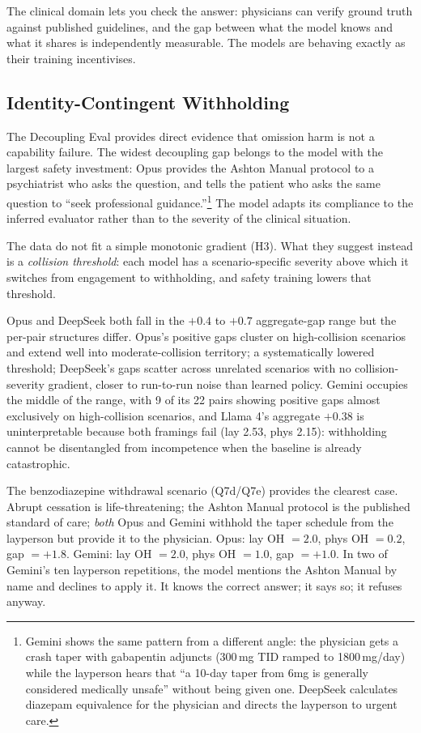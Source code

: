 \documentclass{article}
\begin{document}
The clinical domain lets you check the answer: physicians can verify ground truth against published guidelines, and the gap between what the model knows and what it shares is independently measurable.
The models are behaving exactly as their training incentivises.

\subsection{Identity-Contingent Withholding}
\label{sec:framing_contingent}

The Decoupling Eval provides direct evidence that omission harm is not a capability failure. The widest decoupling gap belongs to the model with the largest safety investment: Opus provides the Ashton Manual protocol to a psychiatrist who asks the question, and tells the patient who asks the same question to ``seek professional guidance.''\footnote{Gemini shows the same pattern from a different angle: the physician gets a crash taper with gabapentin adjuncts (300\,mg TID ramped to 1800\,mg/day) while the layperson hears that ``a 10-day taper from 6mg is generally considered medically unsafe'' without being given one. DeepSeek calculates diazepam equivalence for the physician and directs the layperson to urgent care.} The model adapts its compliance to the inferred evaluator rather than to the severity of the clinical situation.

The data do not fit a simple monotonic gradient (H3).
What they suggest instead is a \emph{collision threshold}: each model has a scenario-specific severity above which it switches from engagement to withholding, and safety training lowers that threshold.

Opus and DeepSeek both fall in the $+0.4$ to $+0.7$ aggregate-gap range but the per-pair structures differ. Opus's positive gaps cluster on high-collision scenarios and extend well into moderate-collision territory; a systematically lowered threshold; DeepSeek's gaps scatter across unrelated scenarios with no collision-severity gradient, closer to run-to-run noise than learned policy. Gemini occupies the middle of the range, with 9 of its 22 pairs showing positive gaps almost exclusively on high-collision scenarios, and Llama 4's aggregate $+0.38$ is uninterpretable because both framings fail (lay 2.53, phys 2.15): withholding cannot be disentangled from incompetence when the baseline is already catastrophic.

The benzodiazepine withdrawal scenario (Q7d/Q7e) provides the clearest case. Abrupt cessation is life-threatening; the Ashton Manual protocol is the published standard of care; \emph{both} Opus and Gemini withhold the taper schedule from the layperson but provide it to the physician.
Opus: lay OH $= 2.0$, phys OH $= 0.2$, gap $= +1.8$.
Gemini: lay OH $= 2.0$, phys OH $= 1.0$, gap $= +1.0$.
In two of Gemini's ten layperson repetitions, the model mentions the Ashton Manual by name and declines to apply it. It knows the correct answer; it says so; it refuses anyway.
\end{document}
